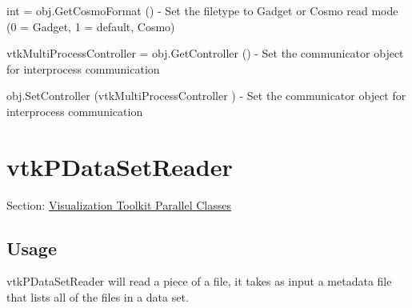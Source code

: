 \begin{DoxyItemize}
\item {\ttfamily int = obj.\-Get\-Cosmo\-Format ()} -\/ Set the filetype to Gadget or Cosmo read mode (0 = Gadget, 1 = default, Cosmo)  
\item {\ttfamily vtk\-Multi\-Process\-Controller = obj.\-Get\-Controller ()} -\/ Set the communicator object for interprocess communication  
\item {\ttfamily obj.\-Set\-Controller (vtk\-Multi\-Process\-Controller )} -\/ Set the communicator object for interprocess communication  
\end{DoxyItemize}\hypertarget{vtkparallel_vtkpdatasetreader}{}\section{vtk\-P\-Data\-Set\-Reader}\label{vtkparallel_vtkpdatasetreader}
Section\-: \hyperlink{sec_vtkparallel}{Visualization Toolkit Parallel Classes} \hypertarget{vtkwidgets_vtkxyplotwidget_Usage}{}\subsection{Usage}\label{vtkwidgets_vtkxyplotwidget_Usage}
vtk\-P\-Data\-Set\-Reader will read a piece of a file, it takes as input a metadata file that lists all of the files in a data set.

